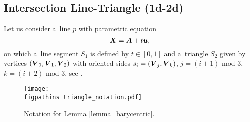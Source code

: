 


\subsection{Intersection Line-Triangle (1d-2d)}
\label{sec:1d-2d}
Let us consider a~line $p$ with parametric equation 
\begin{equation}
    \label{eq:line_parametric}
    \mathbf{\boldsymbol{X}} = \mathbf{\boldsymbol{A}} + t\mathbf{\boldsymbol{u}},
\end{equation}
on which a~line segment $S_1$ is defined by $t\in [0,1]$ and a~triangle $S_2$ given by vertices $(\mathbf{\boldsymbol{V}}_0, \mathbf{\boldsymbol{V}}_1, \mathbf{\boldsymbol{V}}_2)$ 
with oriented sides $s_i=(\mathbf{\boldsymbol{V}}_j, \mathbf{\boldsymbol{V}}_k)$, $j=(i+1)\text{ mod }3$, $k=(i+2)\text{ mod }3$, see .

\begin{figure}[!htb]
    \centering
    \texttt{[image: \\figpathins triangle\_notation.pdf]}
    \caption{Notation for Lemma \ref{lemma_barycentric}.}
    \label{fig:triangle_notation}
\end{figure}

